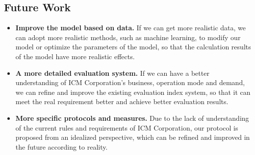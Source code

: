 \documentclass{mcmthesis}
\begin{document}
\subsection{Future Work}
\begin{itemize}
    \item \textbf{Improve the model based on data.}  If we can get more realistic data, we can adopt more realistic methods, such as machine learning, to modify our model or optimize the parameters of the model, so that the calculation results of the model have more realistic effects.
    \item \textbf{A more detailed evaluation system.}  If we can have a better understanding of ICM Corporation's business, operation mode and demand, we can refine and improve the existing evaluation index system, so that it can meet the real requirement  better and achieve better evaluation results.
    \item \textbf{More specific protocols and measures.}  Due to the lack of understanding of the current rules and requirements of ICM Corporation, our protocol is proposed from an idealized perspective, which can be refined and improved in the future according to reality.
\end{itemize}
\end{document}
